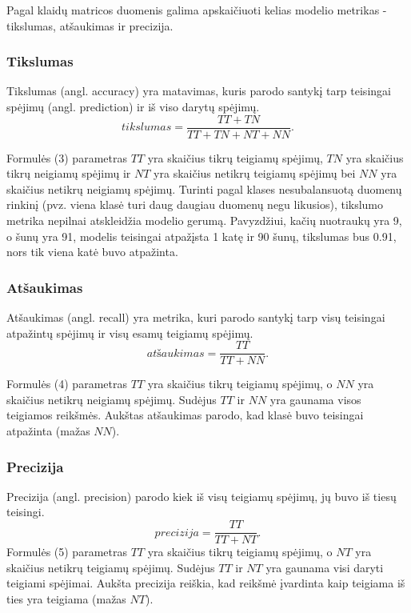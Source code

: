 \documentclass{VUMIFPSbakalaurinis}
\begin{document}
Pagal klaidų matricos duomenis galima apskaičiuoti kelias modelio metrikas - tikslumas, atšaukimas ir precizija.

\subsubsection{Tikslumas}
Tikslumas (angl. accuracy) yra matavimas, kuris parodo santykį tarp teisingai spėjimų (angl. prediction) ir iš viso darytų spėjimų.
\begin{equation}
\textit{tikslumas} = \frac{TT + TN}{TT + TN + NT + NN}.
\end{equation}

Formulės (3) parametras \(TT\) yra skaičius tikrų teigiamų spėjimų, \(TN\) yra skaičius tikrų neigiamų spėjimų ir \(NT\) yra skaičius netikrų teigiamų spėjimų bei \(NN\) yra skaičius netikrų neigiamų spėjimų.
Turinti pagal klases nesubalansuotą duomenų rinkinį (pvz. viena klasė turi daug daugiau duomenų negu likusios), tikslumo metrika nepilnai atskleidžia modelio gerumą. Pavyzdžiui, kačių nuotraukų yra 9, o šunų yra 91, modelis teisingai atpažįsta 1 katę ir 90 šunų, tikslumas bus 0.91, nors tik viena katė buvo atpažinta. 

\subsubsection{Atšaukimas}
Atšaukimas (angl. recall) yra metrika, kuri parodo santykį tarp visų teisingai atpažintų spėjimų ir visų esamų teigiamų spėjimų.
\begin{equation}
\textit{atšaukimas} = \frac{TT}{TT + NN}.
\end{equation}

Formulės (4) parametras \(TT\) yra skaičius tikrų teigiamų spėjimų, o \(NN\) yra skaičius netikrų neigiamų spėjimų. Sudėjus \(TT\) ir \(NN\) yra gaunama visos teigiamos reikšmės.
Aukštas atšaukimas parodo, kad klasė buvo teisingai atpažinta (mažas \(NN\)).

\subsubsection{Precizija}
Precizija (angl. precision) parodo kiek iš visų teigiamų spėjimų, jų buvo iš tiesų teisingi. 
\begin{equation}
\textit{precizija} = \frac{TT}{TT + NT}.
\end{equation}
Formulės (5) parametras \(TT\) yra skaičius tikrų teigiamų spėjimų, o \(NT\) yra skaičius netikrų teigiamų spėjimų. Sudėjus \(TT\) ir \(NT\) yra gaunama visi daryti teigiami spėjimai.
Aukšta precizija reiškia, kad reikšmė įvardinta kaip teigiama iš ties yra teigiama (mažas \(NT\)).
\end{document}
